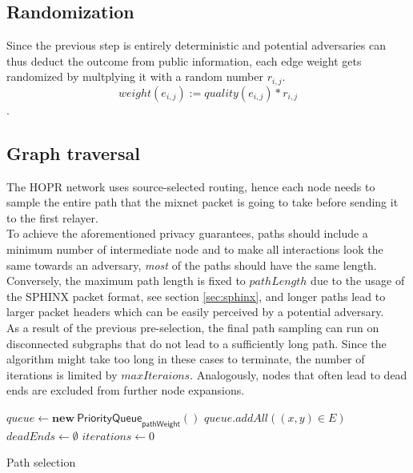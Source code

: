 \subsection{Randomization}
\label{sec:pathselection:randomization}

Since the previous step is entirely deterministic and potential adversaries can thus deduct the outcome from public information, each edge weight gets randomized by multplying it with a random number $r_{i,j}$.
$$weight(e_{i,j}) := quality(e_{i,j}) * r_{i,j}$$.

\subsection{Graph traversal}
\label{sec:pathselection:graph-traversal}

The HOPR network uses source-selected routing, hence each node needs to sample the entire path that the mixnet packet is going to take before sending it to the first relayer.
\\To achieve the aforementioned privacy guarantees, paths should include a minimum number of intermediate node and to make all interactions look the same towards an adversary, \textit{most} of the paths should have the same length. Conversely, the maximum path length is fixed to $pathLength$ due to the usage of the SPHINX packet format, see section \ref{sec:sphinx}, and longer paths lead to larger packet headers which can be easily perceived by a potential adversary.
\\As a result of the previous pre-selection, the final path sampling can run on disconnected subgraphs that do not lead to a sufficiently long path. Since the algorithm might take too long in these cases to terminate, the number of iterations is limited by ${maxIteraions}$. Analogously, nodes that often lead to dead ends are excluded from further node expansions.

\begin{algorithm}[H]
    \SetAlgoNoLine
    \DontPrintSemicolon
    $queue \leftarrow \mathbf{new} \ \mathsf{PriorityQueue}_{\textsf{pathWeight}}()$\;
    $queue.addAll((x,y) \in E)$\;
    $deadEnds \leftarrow \emptyset$\;
    $iterations \leftarrow 0$\;
    \;
    \caption{Path selection}
\end{algorithm}

